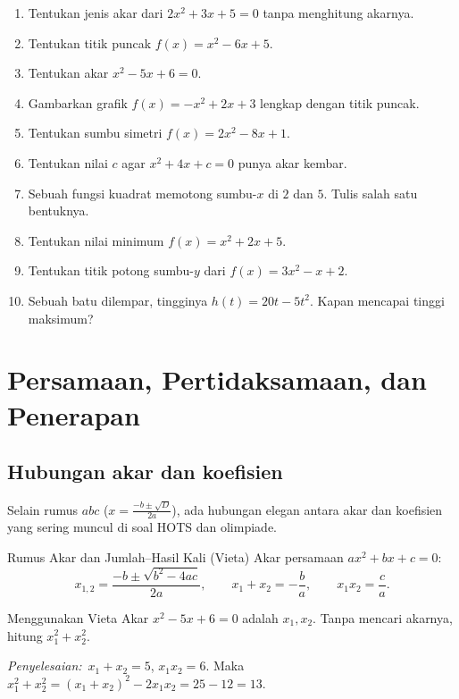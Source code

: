 \documentclass[11pt,a4paper]{report}
\theoremstyle{gaya}
\newcommand{\jawab}{\par\smallskip\noindent\textit{\textcolor{oranye}{Penyelesaian:}}\ }
\begin{document}
\begin{latihan}
\begin{enumerate}[leftmargin=*]
  \item Tentukan jenis akar dari $2x^2+3x+5=0$ tanpa menghitung akarnya.
  \item Tentukan titik puncak $f(x)=x^2-6x+5$.
  \item Tentukan akar $x^2-5x+6=0$.
  \item Gambarkan grafik $f(x)=-x^2+2x+3$ lengkap dengan titik puncak.
  \item Tentukan sumbu simetri $f(x)=2x^2-8x+1$.
  \item Tentukan nilai $c$ agar $x^2+4x+c=0$ punya akar kembar.
  \item Sebuah fungsi kuadrat memotong sumbu-$x$ di $2$ dan $5$. Tulis salah satu bentuknya.
  \item Tentukan nilai minimum $f(x)=x^2+2x+5$.
  \item Tentukan titik potong sumbu-$y$ dari $f(x)=3x^2-x+2$.
  \item Sebuah batu dilempar, tingginya $h(t)=20t-5t^2$. Kapan mencapai tinggi maksimum?
\end{enumerate}
\end{latihan}

\section{Persamaan, Pertidaksamaan, dan Penerapan}

\subsection*{Hubungan akar dan koefisien}
Selain rumus $abc$ ($x=\tfrac{-b\pm\sqrt D}{2a}$), ada hubungan elegan antara akar dan koefisien yang sering muncul di soal HOTS dan olimpiade.

\begin{konsep}{Rumus Akar dan Jumlah--Hasil Kali (Vieta)}
Akar persamaan $ax^2+bx+c=0$:
\[
x_{1,2}=\frac{-b\pm\sqrt{b^2-4ac}}{2a},\qquad
x_1+x_2=-\frac{b}{a},\qquad x_1 x_2=\frac{c}{a}.
\]
\end{konsep}

\begin{contoh}{Menggunakan Vieta}
Akar $x^2-5x+6=0$ adalah $x_1,x_2$. Tanpa mencari akarnya, hitung $x_1^2+x_2^2$.

\jawab $x_1+x_2=5$, $x_1x_2=6$. Maka $x_1^2+x_2^2=(x_1+x_2)^2-2x_1x_2=25-12=13$.
\end{contoh}
\end{document}
